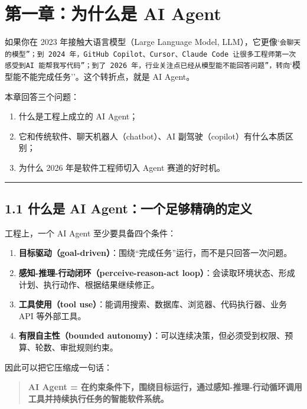 \chapter{第一章：为什么是 AI Agent}

如果你在 2023 年接触大语言模型（Large Language Model, LLM），它更像`\texttt{会聊天的模型''；到 2024 年，GitHub Copilot、Cursor、Claude Code 让很多工程师第一次感受到}\texttt{AI 能帮我写代码''；到了 2026 年，行业关注点已经从}\texttt{模型能不能回答问题''，转向}`模型能不能完成任务''。这个转折点，就是 AI Agent。


本章回答三个问题：


\begin{enumerate}[leftmargin=2em]
\item 什么是工程上成立的 AI Agent；
\item 它和传统软件、聊天机器人（chatbot）、AI 副驾驶（copilot）有什么本质区别；
\item 为什么 2026 年是软件工程师切入 Agent 赛道的好时机。
\end{enumerate}

\bigskip\hrule\bigskip

\section{1.1 什么是 AI Agent：一个足够精确的定义}

工程上，一个 AI Agent 至少要具备四个条件：


\begin{enumerate}[leftmargin=2em]
\item \textbf{目标驱动（goal-driven）}：围绕``完成任务''运行，而不是只回答一次问题。
\item \textbf{感知-推理-行动闭环（perceive-reason-act loop）}：会读取环境状态、形成计划、执行动作、根据结果继续修正。
\item \textbf{工具使用（tool use）}：能调用搜索、数据库、浏览器、代码执行器、业务 API 等外部工具。
\item \textbf{有限自主性（bounded autonomy）}：可以连续决策，但必须受到权限、预算、轮数、审批规则约束。
\end{enumerate}

因此可以把它压缩成一句话：


\begin{quote}
\textbf{AI Agent = 在约束条件下，围绕目标运行，通过感知-推理-行动循环调用工具并持续执行任务的智能软件系统。}\\
\end{quote}

